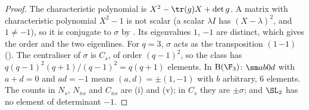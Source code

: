 \begin{proof}
The characteristic polynomial is $X^2-\tr(g)X+\det g$. A matrix with characteristic polynomial $X^2-1$ is not scalar (a scalar $\lambda I$ has $(X-\lambda)^2$, and
$1\ne-1$), so it is conjugate to $\sigma$ by . Its eigenvalues $1$, $-1$ are distinct, which gives the order and the two eigenlines. For
$q=3$, $\sigma$ acts as the transposition $(1\,{-1})$ (). The centraliser of $\sigma$ is $C_s$, of order $(q-1)^2$, so the class has
$q(q-1)^2(q+1)/(q-1)^2=q(q+1)$ elements. In $\mathrm B(\F_3)$: $\sm ab0d$ with $a+d=0$ and $ad=-1$ means $(a,d)=\pm(1,-1)$ with $b$ arbitrary, $6$ elements. The counts in $N_s$,
$N_{ns}$ and $C_{ns}$ are (i) and (v); in $C_s$ they are $\pm\sigma$; and $\SL_2$ has no element of determinant $-1$.
\end{proof}

